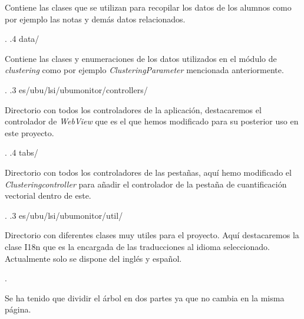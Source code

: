 {\begin{minipage}[t]{10cm}
                        \normalfont
                        Contiene las clases que se utilizan para recopilar los datos de los alumnos como por ejemplo las notas y demás datos relacionados{.}
                    \end{minipage}.
                .4 data/ \\
                \hphantom{0cm}{}
                \begin{minipage}[t]{10cm}
                    \normalfont
                    Contiene las clases y enumeraciones de los datos utilizados en el módulo de \emph{clustering} como por ejemplo \emph{ClusteringParameter} mencionada anteriormente{.}
                \end{minipage}.
            .3 es/ubu/lsi/ubumonitor/controllers/ \\
            \hphantom{0cm}{}
            \begin{minipage}[t]{10cm}
                \normalfont
                Directorio con todos los controladores de la aplicación, destacaremos el controlador de \emph{WebView} que es el que hemos modificado para su posterior uso en este proyecto{.}
            \end{minipage}.
                .4 tabs/ \\
                \hphantom{0cm}{}
                \begin{minipage}[t]{10cm}
                    \normalfont
                    Directorio con todos los controladores de las pestañas, aquí hemo modificado el \emph{Clusteringcontroller} para añadir el controlador de la pestaña de cuantificación vectorial dentro de este{.}
                \end{minipage}.
            .3 es/ubu/lsi/ubumonitor/util/ \\
            \hphantom{0cm}{}
            \begin{minipage}[t]{10cm}
                \normalfont
                Directorio con diferentes clases muy utiles para el proyecto{.} Aquí destacaremos la clase I18n que es la encargada de las traducciones al idioma seleccionado{.} Actualmente solo se dispone del inglés y español{.}
            \end{minipage}.
}

Se ha tenido que dividir el árbol en dos partes ya que no cambia en la misma página.
\\ \\ \\

